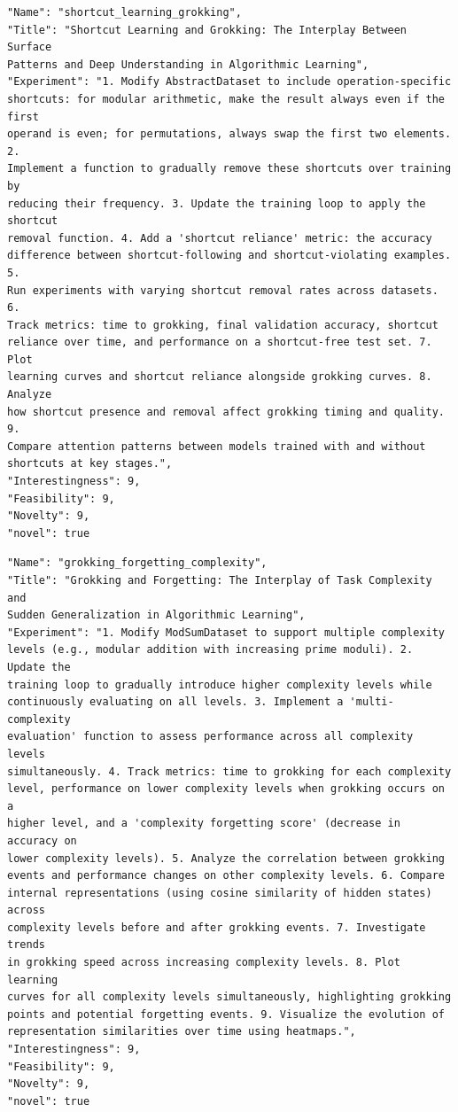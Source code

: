 \documentclass[11pt, a4paper]{include/gdm_format}
\begin{document}
\begin{tcolorbox}[breakable,colback=blue!5!white, colframe=blue!75!black, title=Idea 49/50 - \texttt{shortcut\_learning\_grokking}]
\small
\begin{verbatim}
"Name": "shortcut_learning_grokking",
"Title": "Shortcut Learning and Grokking: The Interplay Between Surface
Patterns and Deep Understanding in Algorithmic Learning",
"Experiment": "1. Modify AbstractDataset to include operation-specific
shortcuts: for modular arithmetic, make the result always even if the first
operand is even; for permutations, always swap the first two elements. 2.
Implement a function to gradually remove these shortcuts over training by
reducing their frequency. 3. Update the training loop to apply the shortcut
removal function. 4. Add a 'shortcut reliance' metric: the accuracy
difference between shortcut-following and shortcut-violating examples. 5.
Run experiments with varying shortcut removal rates across datasets. 6.
Track metrics: time to grokking, final validation accuracy, shortcut
reliance over time, and performance on a shortcut-free test set. 7. Plot
learning curves and shortcut reliance alongside grokking curves. 8. Analyze
how shortcut presence and removal affect grokking timing and quality. 9.
Compare attention patterns between models trained with and without
shortcuts at key stages.",
"Interestingness": 9,
"Feasibility": 9,
"Novelty": 9,
"novel": true
\end{verbatim}
\end{tcolorbox}

\begin{tcolorbox}[breakable,colback=blue!5!white, colframe=blue!75!black, title=Idea 50/50 - \texttt{grokking\_forgetting\_complexity}]
\small
\begin{verbatim}
"Name": "grokking_forgetting_complexity",
"Title": "Grokking and Forgetting: The Interplay of Task Complexity and
Sudden Generalization in Algorithmic Learning",
"Experiment": "1. Modify ModSumDataset to support multiple complexity
levels (e.g., modular addition with increasing prime moduli). 2. Update the
training loop to gradually introduce higher complexity levels while
continuously evaluating on all levels. 3. Implement a 'multi-complexity
evaluation' function to assess performance across all complexity levels
simultaneously. 4. Track metrics: time to grokking for each complexity
level, performance on lower complexity levels when grokking occurs on a
higher level, and a 'complexity forgetting score' (decrease in accuracy on
lower complexity levels). 5. Analyze the correlation between grokking
events and performance changes on other complexity levels. 6. Compare
internal representations (using cosine similarity of hidden states) across
complexity levels before and after grokking events. 7. Investigate trends
in grokking speed across increasing complexity levels. 8. Plot learning
curves for all complexity levels simultaneously, highlighting grokking
points and potential forgetting events. 9. Visualize the evolution of
representation similarities over time using heatmaps.",
"Interestingness": 9,
"Feasibility": 9,
"Novelty": 9,
"novel": true
\end{verbatim}
\end{tcolorbox}
\end{document}
